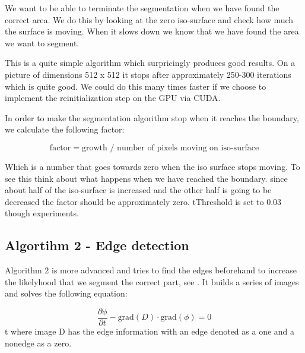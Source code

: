 We want to be able to terminate the segmentation when we have found the correct area. We do this by looking at the zero iso-surface and check how much the surface is moving. When it slows down we know that we have found the area we want to segment.

This is a quite simple algorithm which surpricingly produces good results. On a picture of dimensions 512 x 512 it stops after approximately 250-300 iterations which is quite good. We could do this many times faster if we choose to implement the reinitialization step on the GPU via CUDA.

In order to make the segmentation algorithm stop when it reaches the boundary, we calculate the following factor:

\begin{equation*}
 \textrm{factor} = \textrm{growth } / \textrm{ number of pixels moving on iso-surface}
\end{equation*}

Which is a number that goes towards zero when the iso surface stops moving. To see this think about what happens when we have reached the boundary. since about half of the iso-surface is increased and the other half is going to be decreased the factor should be approximately zero. tThreshold is set to 0.03 though experiments.


\subsection{Algortihm 2 - Edge detection}
\label{segmentation:sec:algorithm2}


Algorithm 2 is more advanced and tries to find the edges beforehand to increase the likelyhood that we segment the correct part, see . It builds a series of images and solves the following equation:

\begin{equation}
\label{segmentation:equation:advanced}
  \dfrac{\partial \phi}{\partial t} - \textrm{grad}(D) \cdot \textrm{grad}(\phi) = 0
\end{equation}
t
where image D has the edge information with an edge denoted as a one and a nonedge as a zero.

